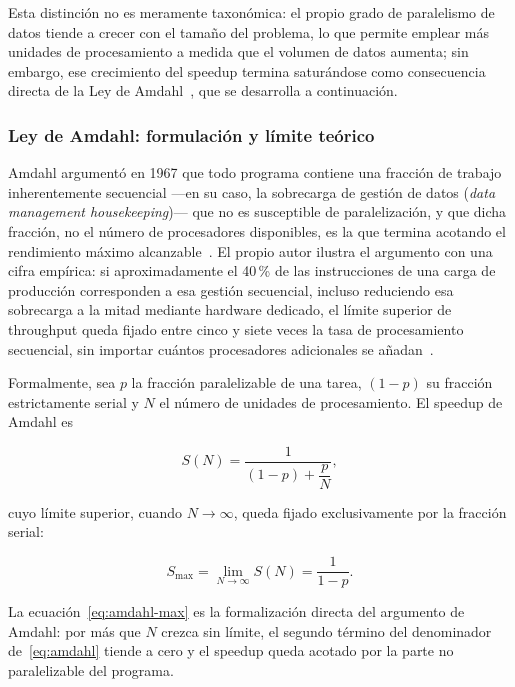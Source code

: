 \documentclass[11pt,a4paper]{article}
\begin{document}
    Esta distinción no es meramente taxonómica: el propio grado de
    paralelismo de datos tiende a crecer con el tamaño del problema, lo
    que permite emplear más unidades de procesamiento a medida que el
    volumen de datos aumenta; sin embargo, ese crecimiento del speedup
    termina saturándose como consecuencia directa de la Ley de
    Amdahl~\autocite{grama2003,amdahl1967}, que se desarrolla a continuación.

    \subsubsection{Ley de Amdahl: formulación y límite teórico}

    Amdahl argumentó en 1967 que todo programa contiene una fracción de
    trabajo inherentemente secuencial —en su caso, la sobrecarga de
    gestión de datos (\emph{data management housekeeping})— que no es
    susceptible de paralelización, y que dicha fracción, no el número de
    procesadores disponibles, es la que termina acotando el rendimiento
    máximo alcanzable~\autocite{amdahl1967}. El propio autor ilustra el
    argumento con una cifra empírica: si aproximadamente el 40\,\% de las
    instrucciones de una carga de producción corresponden a esa gestión
    secuencial, incluso reduciendo esa sobrecarga a la mitad mediante
    hardware dedicado, el límite superior de throughput queda fijado entre
    cinco y siete veces la tasa de procesamiento secuencial, sin importar
    cuántos procesadores adicionales se añadan~\autocite{amdahl1967}.

    Formalmente, sea $p$ la fracción paralelizable de una tarea,
    $(1-p)$ su fracción estrictamente serial y $N$ el número de unidades
    de procesamiento. El speedup de Amdahl es

    \begin{equation}
        S(N) = \frac{1}{(1-p) + \dfrac{p}{N}},
        \label{eq:amdahl}
    \end{equation}

    cuyo límite superior, cuando $N \to \infty$, queda fijado
    exclusivamente por la fracción serial:

    \begin{equation}
        S_{\max} = \lim_{N \to \infty} S(N) = \frac{1}{1-p}.
        \label{eq:amdahl-max}
    \end{equation}

    La ecuación~\eqref{eq:amdahl-max} es la formalización directa del argumento
    de Amdahl: por más que $N$ crezca sin límite, el segundo término del
    denominador de~\eqref{eq:amdahl} tiende a cero y el speedup queda
    acotado por la parte no paralelizable del programa.
\end{document}
